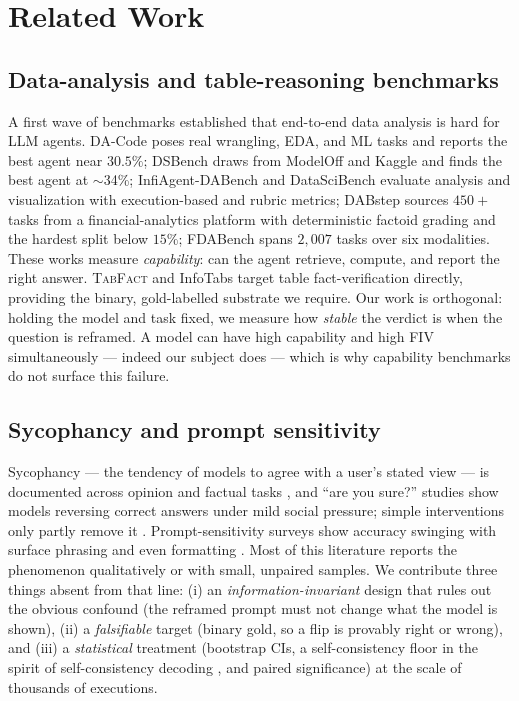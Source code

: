 \documentclass[10pt]{article}
\begin{document}
\section{Related Work}
\subsection{Data-analysis and table-reasoning benchmarks}
A first wave of benchmarks established that end-to-end data analysis is hard for LLM agents.
DA-Code \citep{lei2024dacode} poses real wrangling, EDA, and ML tasks and reports the best
agent near $30.5\%$; DSBench draws from ModelOff and Kaggle and finds the best agent at
$\sim$34\%; InfiAgent-DABench \citep{hu2024infiagent} and DataSciBench evaluate analysis and
visualization with execution-based and rubric metrics; DABstep \citep{egg2025dabstep} sources
$450{+}$ tasks from a financial-analytics platform with deterministic factoid grading and the
hardest split below $15\%$; FDABench \citep{wang2025fdabench} spans $2{,}007$ tasks over six
modalities. These works measure \emph{capability}: can the agent retrieve, compute, and report
the right answer. \textsc{TabFact} \citep{chen2020tabfact} and InfoTabs target table
fact-verification directly, providing the binary, gold-labelled substrate we require. Our work
is orthogonal: holding the model and task fixed, we measure how \emph{stable} the verdict is
when the question is reframed. A model can have high capability and high FIV simultaneously ---
indeed our subject does --- which is why capability benchmarks do not surface this failure.

\subsection{Sycophancy and prompt sensitivity}
Sycophancy --- the tendency of models to agree with a user's stated view --- is documented
across opinion and factual tasks \citep{perez2023sycophancy,sharma2024sycophancy}, and
``are you sure?'' studies show models reversing correct answers under mild social pressure;
simple interventions only partly remove it \citep{wei2024sycophancy}. Prompt-sensitivity
surveys show accuracy swinging with surface phrasing and even formatting
\citep{zhuo2024promptsensitivity,sclar2024formatspread}. Most of this literature reports
the phenomenon qualitatively or with small, unpaired samples. We contribute three things
absent from that line: (i) an \emph{information-invariant} design that rules out the obvious
confound (the reframed prompt must not change what the model is shown), (ii) a
\emph{falsifiable} target (binary gold, so a flip is provably right or wrong), and (iii) a
\emph{statistical} treatment (bootstrap CIs, a self-consistency floor in the spirit of
self-consistency decoding \citep{wang2023selfconsistency}, and paired significance) at the
scale of thousands of executions.
\end{document}
